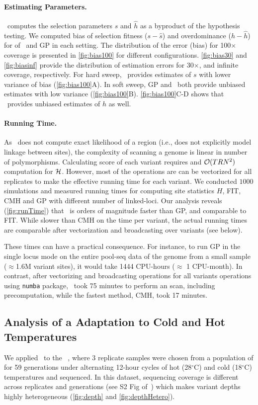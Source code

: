 \paragraph{Estimating Parameters.}
\comale\ computes the selection parameters $\hat{s}$ and $\hat{h}$ as
a byproduct of the hypothesis testing. We computed bias of selection
fitness ($s-\hat{s}$) and overdominance ($h-\hat{h}$) for of \comale\
and GP in each setting. The distribution of the error (bias) for
100$\times$ coverage is presented in \ref{fig:bias100} for
different configurations.
\ref{fig:bias30} and \ref{fig:biasinf} provide the
distribution of estimation errors for 30$\times$, and infinite
coverage, respectively.  For hard sweep, \comale\ provides estimates
of $s$ with lower variance of bias (\ref{fig:bias100}A). In soft
sweep, GP and \comale\ both provide unbiased estimates with low
variance (\ref{fig:bias100}B). \ref{fig:bias100}C-D shows
that \comale\ provides unbiased estimates of $h$ as well.

\paragraph{Running Time.}
As \comale\ does not compute exact likelihood of a region (i.e., does
not explicitly model linkage between sites), the complexity of
scanning a genome is linear in number of polymorphisms.  Calculating
score of each variant requires and ${\cal O}(TRN^2)$ computation
for ${\cal H}$. However, most of the operations
are can be vectorized for all replicates to make the effective running
time for each variant.  We
conducted $1000$ simulations and measured running times for computing site 
statistics $H$, FIT, CMH and GP with different number of linked-loci.  Our
analysis reveals (\ref{fig:runTime}) that \comale\ is orders of
magnitude faster than GP, and comparable to FIT. While slower than CMH
on the time per variant, the actual running times are comparable after
vectorization and broadcasting over variants (see below).

These times can have a practical consequence. For instance, to run GP
in the single locus mode on the entire pool-seq data of the \dmel genome from a
small sample ($\approx$1.6M variant sites), it would take 1444 CPU-hours
($\approx$ 1 CPU-month). In contrast, after vectorizing and
broadcasting operations for all variants operations using
\texttt{numba} package, \comale\ took 75 minutes to perform an
scan, including precomputation, while the fastest method, CMH, took 17 minutes.

\subsection{Analysis of a \dmel Adaptation to Cold and Hot 
Temperatures}\label{sec:dmel}
We applied \comale\ to the 
\datadm~\cite{orozco2012adaptation,franssen2015patterns}, where
3 replicate samples were chosen from a population of \dmel for 59
generations under alternating 12-hour cycles of hot (28$^{\circ}$C)
and cold (18$^{\circ}$C) temperatures and sequenced.  In this dataset,
sequencing coverage is different across replicates and generations
(see S2 Fig of~\cite{Terhorst2015Multi}) which makes variant depths
highly heterogeneous (\ref{fig:depth} and \ref{fig:depthHetero}). 

